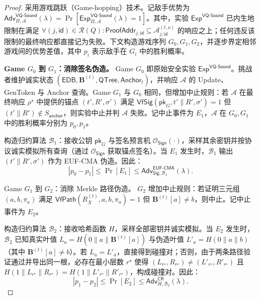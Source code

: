 \begin{proof}
采用游戏跳跃（Game-hopping）技术。记敌手优势为 $\mathsf{Adv}_{\Pi,\mathcal{A}}^{\mathsf{VQ\text{-}Sound}}(\lambda)=\Pr[\mathsf{Exp}_{\Pi,\mathcal{A}}^{\mathsf{VQ\text{-}Sound}}(\lambda)=1]$。其中，实验 $\mathsf{Exp}^{\mathsf{VQ\text{-}Sound}}$ 已内生地限制在满足 $\forall(j,\mathsf{id})\in\mathcal{R}(Q):\mathsf{ProofAddr}_{j,\mathsf{id}}\subseteq \mathcal{A}_{j,\mathsf{id}}^{(t,\nu)}$ 的响应之上；任何违反该限制的最终响应都直接记为失败。下文构造游戏序列 $G_0,G_1,G_2$，并逐步界定相邻游戏间的优势差值，其中 $p_i$ 表示敌手在 $G_i$ 中的胜利概率。

\textbf{Game $G_0$ 到 $G_1$：消除签名伪造。}
Game $G_0$ 即原始安全实验 $\mathsf{Exp}^{\mathsf{VQ\text{-}Sound}}$。挑战者维护诚实状态 $(\mathsf{EDB},\mathbf{B}^{(t)},\mathsf{QTree},\mathsf{Anchor}_t)$，并响应 $\mathcal{A}$ 的 Update、GenToken 与 Anchor 查询。Game $G_1$ 与 $G_0$ 相同，但增加中止规则：若 $\mathcal{A}$ 在最终响应 $\rho^\star$ 中提供的锚点 $(t',R',\sigma')$ 满足 $\mathsf{VfSig}(\mathsf{pk}_G,t'\|R',\sigma')=1$ 但 $(t'\|R')\notin S_{\mathsf{anchor}}$，则实验中止并判 $\mathcal{A}$ 失败。记中止事件为 $E_1$，$\mathcal{A}$ 在 $G_0,G_1$ 中的胜利概率分别为 $p_0,p_1$。

构造归约算法 $\mathcal{B}_1$：接收公钥 $\mathsf{pk}_G$ 与签名预言机 $\mathcal{O}_{\mathsf{Sign}}(\cdot)$，采样其余密钥并按协议诚实模拟所有查询（通过 $\mathcal{O}_{\mathsf{Sign}}$ 获取锚点签名）。当 $E_1$ 发生时，$\mathcal{B}_1$ 输出 $(t'\|R',\sigma')$ 作为 EUF-CMA 伪造。因此：
\begin{equation}
|p_0-p_1|\le \Pr[E_1]\le \mathsf{Adv}_{\mathsf{Sig},\mathcal{B}_1}^{\mathsf{EUF\text{-}CMA}}(\lambda)\text{.}
\end{equation}

Game $G_1$ 到 $G_2$：消除 Merkle 路径伪造。
$G_2$ 增加中止规则：若证明三元组 $(a,b,\pi_a)$ 满足 $\mathsf{VfPath}(R_X^{(t)},a,b,\pi_a)=1$ 但 $\mathbf{B}^{(t)}[a]\neq b$，则中止。记中止事件为 $E_2$。

构造归约算法 $\mathcal{B}_2$：接收哈希函数 $H$，采样全部密钥并诚实模拟。当 $E_2$ 发生时，$\mathcal{B}_2$ 已知真实叶值 $L_a=H(0\|a\|\mathbf{B}^{(t)}[a])$ 与伪造叶值 $L'_a=H(0\|a\|b)$（其中 $\mathbf{B}^{(t)}[a]\neq b$）。若 $L_a=L'_a$，直接得到碰撞对；否则，由于两条路径验证通过并导出同一根，必存在最小层数 $r^\star$ 使得 $(L_{r^\star},R_{r^\star})\neq (L'_{r^\star},R'_{r^\star})$ 且 $H(1\|L_{r^\star}\|R_{r^\star})=H(1\|L'_{r^\star}\|R'_{r^\star})$，构成碰撞对。因此：
\begin{equation}
|p_1-p_2|\le \Pr[E_2]\le \mathsf{Adv}_{H,\mathcal{B}_2}^{\mathsf{CR}}(\lambda)\text{.}
\end{equation}


\end{proof}
